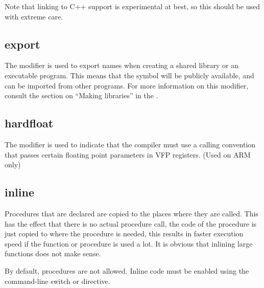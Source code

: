 Note that linking to C++ support is experimental at best, so this should be used with
extreme care.

\subsection{export}
The  modifier is used to export names when creating a shared library
or an executable program. This means that the symbol will be publicly
available, and can be imported from other programs. For more information
on this modifier, consult the section on ``Making libraries''
in the \progref.

\subsection{hardfloat}
The  modifier is used to indicate that the compiler must
use a calling convention that passes certain floating point parameters in VFP registers.
(Used on ARM only)

\subsection{inline}
\label{se:inline}
Procedures that are declared  are copied to the places where they
are called. This has the effect that there is no actual procedure call,
the code of the procedure is just copied to where the procedure is needed,
this results in faster execution speed if the function or procedure is
used a lot. It is obvious that inlining large functions does not make sense.

By default,  procedures are not allowed. Inline code must be enabled
using the command-line switch  or 
directive.

